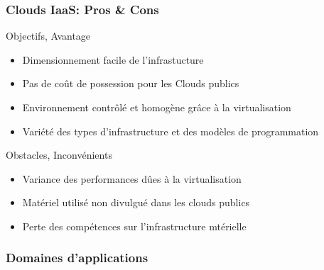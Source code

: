 \documentclass{beamer}
\begin{document}
\begin{frame}
\frametitle{Clouds IaaS: Pros \& Cons }

  \begin{block}{Objectifs, Avantage}
    \begin{itemize}
		\item Dimensionnement facile de l'infrastucture
		\item Pas de coût de possession pour les Clouds publics 
    		\item Environnement contrôlé et homogène grâce à la virtualisation
		\item Variété des types d'infrastructure et des modèles de programmation
    	\end{itemize}
  \end{block}
  \pause
  \begin{block}{Obstacles, Inconvénients}
    \begin{itemize}
		\item Variance des performances dûes à la virtualisation 
    		\item Matériel utilisé non divulgué dans les clouds publics
		\item Perte des compétences sur l'infrastructure mtérielle
    	\end{itemize}
  \end{block}
\end{frame}



\begin{frame}{}
\frametitle{Domaines d'applications}




\end{frame}
\end{document}
